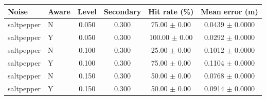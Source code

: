 \begin{tabular}{llcccc}
\hline
Noise & Aware & Level & Secondary & Hit rate (\%) & Mean error (m) \\
\hline
saltpepper & N & 0.050 & 0.300 & 75.00 $\pm$ 0.00 & 0.0439 $\pm$ 0.0000 \\
saltpepper & Y & 0.050 & 0.300 & 100.00 $\pm$ 0.00 & 0.0292 $\pm$ 0.0000 \\
saltpepper & N & 0.100 & 0.300 & 25.00 $\pm$ 0.00 & 0.1012 $\pm$ 0.0000 \\
saltpepper & Y & 0.100 & 0.300 & 75.00 $\pm$ 0.00 & 0.1104 $\pm$ 0.0000 \\
saltpepper & N & 0.150 & 0.300 & 50.00 $\pm$ 0.00 & 0.0768 $\pm$ 0.0000 \\
saltpepper & Y & 0.150 & 0.300 & 50.00 $\pm$ 0.00 & 0.0914 $\pm$ 0.0000 \\
\hline
\end{tabular}
